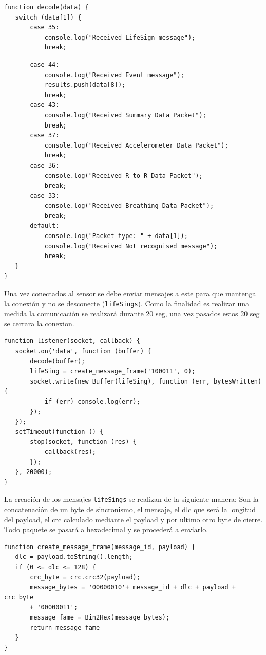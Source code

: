 \begin{verbatim}
function decode(data) {
   switch (data[1]) {
       case 35:
           console.log("Received LifeSign message");
           break;
           \end{verbatim}
           \begin{verbatim}
       case 44:
           console.log("Received Event message");
           results.push(data[8]);
           break;
       case 43:
           console.log("Received Summary Data Packet");
           break;
       case 37:
           console.log("Received Accelerometer Data Packet");
           break;
       case 36:
           console.log("Received R to R Data Packet");
           break;
       case 33:
           console.log("Received Breathing Data Packet");
           break;
       default:
           console.log("Packet type: " + data[1]);
           console.log("Received Not recognised message");
           break;
   }
}
\end{verbatim}

Una vez conectados al sensor se debe enviar mensajes a este para que mantenga la conexión y no se desconecte (\texttt{lifeSings}). Como la finalidad es realizar una medida la comunicación se realizará durante 20 seg, una vez pasados estos 20 seg se cerrara la conexion. 

\begin{verbatim}
function listener(socket, callback) {
   socket.on('data', function (buffer) {
       decode(buffer);
       lifeSing = create_message_frame('100011', 0);
       socket.write(new Buffer(lifeSing), function (err, bytesWritten) {
           if (err) console.log(err);
       });
   });
   setTimeout(function () {
       stop(socket, function (res) {
           callback(res);
       });
   }, 20000);
}
\end{verbatim}

La creación de los mensajes \texttt{lifeSings} se realizan de la siguiente manera: Son la concatenación de un byte de sincronismo, el mensaje, el dlc que será la longitud del payload, el crc calculado mediante el payload y por ultimo otro byte de cierre. Todo paquete se pasará a hexadecimal y se procederá a enviarlo.
 \pagebreak
\begin{verbatim}
function create_message_frame(message_id, payload) {
   dlc = payload.toString().length;
   if (0 <= dlc <= 128) {
       crc_byte = crc.crc32(payload);
       message_bytes = '00000010'+ message_id + dlc + payload + crc_byte 
       + '00000011';
       message_fame = Bin2Hex(message_bytes);
       return message_fame
   }
}
\end{verbatim}

